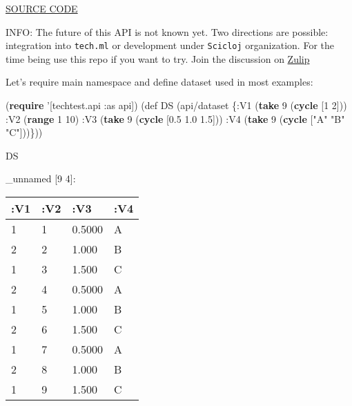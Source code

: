 \documentclass[]{article}
\newenvironment{Shaded}{\begin{snugshade}}{\end{snugshade}}
\newcommand{\KeywordTok}[1]{\textcolor[rgb]{0.13,0.29,0.53}{\textbf{#1}}}
\newcommand{\DecValTok}[1]{\textcolor[rgb]{0.00,0.00,0.81}{#1}}
\newcommand{\FloatTok}[1]{\textcolor[rgb]{0.00,0.00,0.81}{#1}}
\newcommand{\StringTok}[1]{\textcolor[rgb]{0.31,0.60,0.02}{#1}}
\newcommand{\FunctionTok}[1]{\textcolor[rgb]{0.00,0.00,0.00}{#1}}
\newcommand{\BuiltInTok}[1]{#1}
\newcommand{\AttributeTok}[1]{\textcolor[rgb]{0.77,0.63,0.00}{#1}}
\newcommand{\NormalTok}[1]{#1}
\begin{document}
\href{https://github.com/genmeblog/techtest/blob/master/src/techtest/api.clj}{SOURCE
CODE}

INFO: The future of this API is not known yet. Two directions are
possible: integration into \texttt{tech.ml} or development under
\texttt{Scicloj} organization. For the time being use this repo if you
want to try. Join the discussion on
\href{https://clojurians.zulipchat.com/\#narrow/stream/236259-tech.2Eml.2Edataset.2Edev/topic/api}{Zulip}

Let's require main namespace and define dataset used in most examples:

\begin{Shaded}
\begin{Highlighting}[]
\NormalTok{(}\KeywordTok{require}\NormalTok{ '[techtest.api }\AttributeTok{:as}\NormalTok{ api])}
\NormalTok{(}\BuiltInTok{def}\FunctionTok{ DS }\NormalTok{(api/dataset \{}\AttributeTok{:V1}\NormalTok{ (}\KeywordTok{take} \DecValTok{9}\NormalTok{ (}\KeywordTok{cycle}\NormalTok{ [}\DecValTok{1} \DecValTok{2}\NormalTok{]))}
                      \AttributeTok{:V2}\NormalTok{ (}\KeywordTok{range} \DecValTok{1} \DecValTok{10}\NormalTok{)}
                      \AttributeTok{:V3}\NormalTok{ (}\KeywordTok{take} \DecValTok{9}\NormalTok{ (}\KeywordTok{cycle}\NormalTok{ [}\FloatTok{0.5} \FloatTok{1.0} \FloatTok{1.5}\NormalTok{]))}
                      \AttributeTok{:V4}\NormalTok{ (}\KeywordTok{take} \DecValTok{9}\NormalTok{ (}\KeywordTok{cycle}\NormalTok{ [}\StringTok{"A"} \StringTok{"B"} \StringTok{"C"}\NormalTok{]))\}))}
\end{Highlighting}
\end{Shaded}

\begin{Shaded}
\begin{Highlighting}[]
\NormalTok{DS}
\end{Highlighting}
\end{Shaded}

\_unnamed {[}9 4{]}:

\begin{longtable}[]{@{}llll@{}}
\toprule
:V1 & :V2 & :V3 & :V4\tabularnewline
\midrule
\endhead
1 & 1 & 0.5000 & A\tabularnewline
2 & 2 & 1.000 & B\tabularnewline
1 & 3 & 1.500 & C\tabularnewline
2 & 4 & 0.5000 & A\tabularnewline
1 & 5 & 1.000 & B\tabularnewline
2 & 6 & 1.500 & C\tabularnewline
1 & 7 & 0.5000 & A\tabularnewline
2 & 8 & 1.000 & B\tabularnewline
1 & 9 & 1.500 & C\tabularnewline
\bottomrule
\end{longtable}
\end{document}
